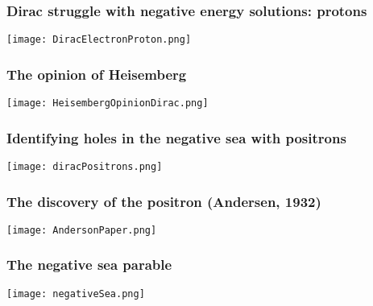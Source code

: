 \begin{frame}
\frametitle{Dirac struggle with negative energy solutions: protons}

\texttt{[image: DiracElectronProton.png]}
\end{frame}

\begin{frame}
\frametitle{The opinion of Heisemberg}

\texttt{[image: HeisembergOpinionDirac.png]}
\end{frame}

\begin{frame}
\frametitle{Identifying holes in the negative sea with positrons}

\texttt{[image: diracPositrons.png]}
\end{frame}

\begin{frame}
\frametitle{The discovery of the positron (Andersen, 1932)}

\texttt{[image: AndersonPaper.png]}
\end{frame}

%
%

\begin{frame}
\frametitle{The negative sea parable}

\texttt{[image: negativeSea.png]}
\end{frame}

%
%
%
%
%






